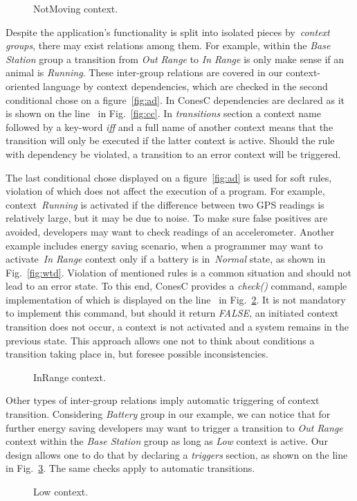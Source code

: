 
\begin{figure}[!h]
\TheSbox
\caption{NotMoving context.}
\label{fig:nmc}
\end{figure}

Despite the application's  functionality is split into isolated pieces by~\emph{context groups},
there may exist relations among them. For example, within the 
\emph{Base Station} group a transition from \emph{Out Range} to \emph{In Range} is only
make sense if an animal is \emph{Running}. These inter-group relations are covered in our
context-oriented language by context dependencies, which are checked in the second
conditional chose on a figure~\ref{fig:ad}. In ConesC dependencies are declared as
it is shown on the line~ in Fig.~\ref{fig:cc}. In \emph{transitions} section a
context name followed by a key-word \emph{iff} and a full name of another context means that
the transition will only be executed if the latter context is active. Should the rule with dependency
be violated, a transition to an error context will be triggered.

The last conditional chose displayed on a figure~\ref{fig:ad} is used for soft rules, violation of
which does not affect the execution of a program. For example, context~\emph{Running} is
activated if the difference between two GPS readings is relatively large, but it may be due to noise.
To make sure false positives are avoided, developers may want to check
readings of an accelerometer. Another example includes energy saving scenario,
when a programmer may want to activate~\emph{In Range} context only if a battery is
in~\emph{Normal} state, as shown in Fig.~\ref{fig:wtd}.
Violation of mentioned rules is a common situation and should not lead to an error state.
To this end, ConesC provides a \emph{check()} command, sample implementation of which is
displayed on the line~ in Fig.~\ref{fig:irc}. It is not mandatory to implement this
command, but should it return \emph{FALSE}, an initiated context transition does not occur,
a context is not activated and a system remains in the previous state.
This approach allows one not to think about conditions a transition taking
place in, but foresee possible inconsistencies.


\begin{figure}[!h]
\TheSbox
\caption{InRange context.}
\label{fig:irc}
\end{figure}

Other types of inter-group relations imply automatic triggering of context
transition. Considering \emph{Battery} group in our example, we can notice that
for further energy saving developers may want to trigger a transition to
\emph{Out Range} context within the \emph{Base Station} group as long as
\emph{Low} context is active. Our design allows one to do that by declaring a
\emph{triggers} section, as shown on the line~ in Fig.~\ref{fig:lc}.
The same checks apply to automatic transitions.


\begin{figure}[!h]
\TheSbox
\caption{Low context.}
\label{fig:lc}
\end{figure}
